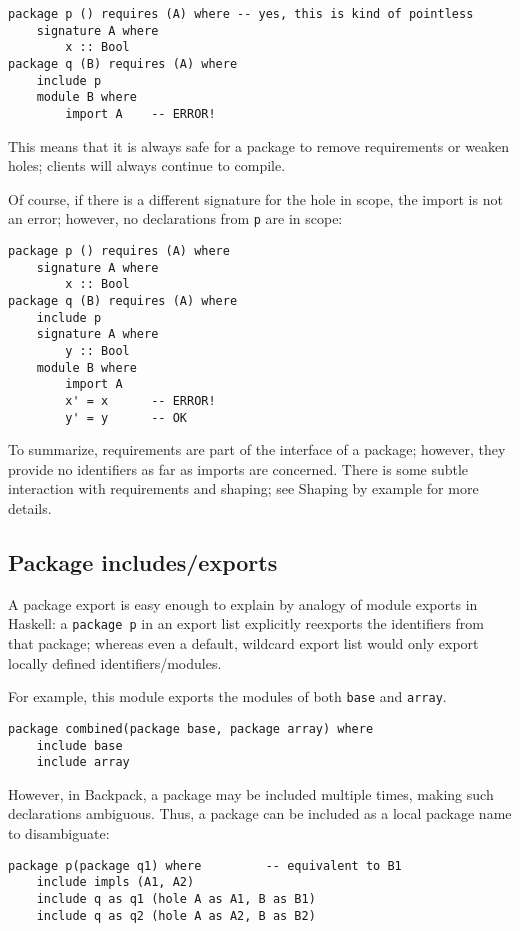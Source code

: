 \documentclass{article}
\newcommand{\Red}[1]{{\color{red} #1}}
\begin{document}
\begin{verbatim}
package p () requires (A) where -- yes, this is kind of pointless
    signature A where
        x :: Bool
package q (B) requires (A) where
    include p
    module B where
        import A    -- ERROR!
\end{verbatim}

This means that it is always safe for a package to remove requirements
or weaken holes; clients will always continue to compile.

Of course, if there is a different signature for the hole in scope, the
import is not an error; however, no declarations from \verb|p| are in scope:

\begin{verbatim}
package p () requires (A) where
    signature A where
        x :: Bool
package q (B) requires (A) where
    include p
    signature A where
        y :: Bool
    module B where
        import A
        x' = x      -- ERROR!
        y' = y      -- OK
\end{verbatim}

To summarize, requirements are part of the interface of a package; however,
they provide no identifiers as far as imports are concerned.  \Red{There is
some subtle interaction with requirements and shaping; see Shaping by example
for more details.}

\subsection{Package includes/exports}

A package export is easy enough to explain by analogy of module exports
in Haskell: a \verb|package p| in an export list explicitly reexports
the identifiers from that package; whereas even a default, wildcard export
list would only export locally defined identifiers/modules.

For example, this module exports the modules of both \verb|base|
and \verb|array|.

\begin{verbatim}
package combined(package base, package array) where
    include base
    include array
\end{verbatim}

However, in Backpack, a package may be included multiple times, making
such declarations ambiguous.  Thus, a package can be included as a local
package name to disambiguate:

\begin{verbatim}
package p(package q1) where         -- equivalent to B1
    include impls (A1, A2)
    include q as q1 (hole A as A1, B as B1)
    include q as q2 (hole A as A2, B as B2)
\end{verbatim}
\end{document}
